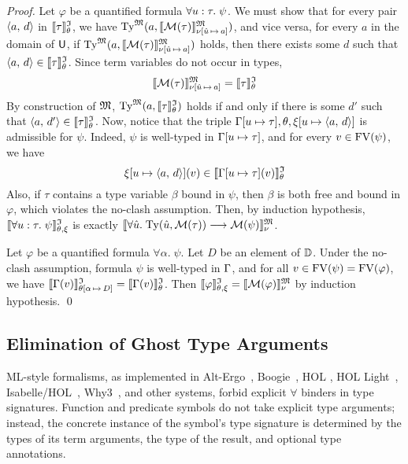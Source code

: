 \begin{proof}
Let $\varphi$ be a quantified formula $\forall u \mathrel{:} \tau .\; \psi$.
We must show that for every pair $\langle a,\, d \rangle$ in $\llbracket\tau\rrbracket^{\mathfrak{I}}_{\theta}$, we have
$\mathrm{Ty}^{\mathfrak{M}}(a, \llbracket \mathcal{M}(\tau) \rrbracket^{\mathfrak{M}}_{\nu[\hat{u}\,\mapsto\,a]})$,
and vice versa, for every $a$ in the domain of $\mathsf{U}$, if
$\mathrm{Ty}^{\mathfrak{M}}(a, \llbracket \mathcal{M}(\tau) \rrbracket^{\mathfrak{M}}_{\nu[\hat{u}\,\mapsto\,a]})$
holds, then there exists some $d$ such that $\langle a,\, d \rangle \in
\llbracket\tau\rrbracket^{\mathfrak{I}}_{\theta}$.
%
Since term variables do not occur in types,
\[\llbracket \mathcal{M}(\tau) \rrbracket^{\mathfrak{M}}_{\nu[\hat{u}\,\mapsto\,a]} =
\llbracket \tau \rrbracket^{\mathfrak{I}}_\theta\]%
By construction of $\mathfrak{M}$,
$\mathrm{Ty}^{\mathfrak{M}}(a, \llbracket \tau \rrbracket^{\mathfrak{I}}_\theta)$
holds if and only if there is some $d'$ such that
$\langle a,\, d' \rangle \in \llbracket \tau \rrbracket^{\mathfrak{I}}_\theta$.
%
Now, notice that the triple $\mathrm{\Gamma}[u \mapsto \tau],
\theta,\xi[u \mapsto \langle a,\, d \rangle]$ is admissible for $\psi$.
Indeed, $\psi$ is well-typed in $\mathrm{\Gamma}[u \mapsto \tau]$,
and for every $v \in \mathrm{FV}(\psi)$, we have
\[\xi[u \mapsto \langle a,\, d \rangle](v) \in \llbracket\mathrm{\Gamma}[u \mapsto \tau](v)\rrbracket^{\mathfrak{I}}_{\theta}\]%
Also, if $\tau$ contains a type variable $\beta$ bound in $\psi$,
then $\beta$ is both free and bound in $\varphi$, which violates
the no-clash assumption.
%
Then, by induction hypothesis, $\llbracket\forall u \mathrel{:} \tau .\; \psi\rrbracket^{\mathfrak{I}}_{\theta,\xi}$
is exactly $\llbracket \forall \hat{u} .\; \mathrm{Ty}(\hat{u},\mathcal{M}(\tau))
\longrightarrow \mathcal{M}(\psi) \rrbracket^{\mathfrak{M}}_{\nu}$.

Let $\varphi$ be a quantified formula $\forall \alpha .\; \psi$.
Let $D$ be an element of $\mathbb{D}$. Under the no-clash assumption,
formula $\psi$ is well-typed in $\mathrm{\Gamma}$, and for all
$v \in \mathrm{FV}(\psi) = \mathrm{FV}(\varphi)$, we have
$\llbracket\mathrm{\Gamma}(v)\rrbracket^{\mathfrak{I}}_{\theta[\alpha\,\mapsto\,D]} = \llbracket\mathrm{\Gamma}(v)\rrbracket^{\mathfrak{I}}_{\theta}$.
Then $\llbracket\varphi\rrbracket^{\mathfrak{I}}_{\theta,\xi} = \llbracket \mathcal{M}(\varphi) \rrbracket^{\mathfrak{M}}_{\nu}$ by induction hypothesis.
\qed
\end{proof}

\subsection{Elimination of Ghost Type Arguments} \label{ssec:ghost}


ML-style formalisms, as implemented in Alt-Ergo~\cite{conchon08smt},
Boogie~\cite{Barnett06boogie}, HOL \cite{gordon-melham-1993}, HOL
Light~\cite{harrison-1996}, Isabelle\slash HOL~\cite{nipkow-et-al-2002},
Why3~\cite{boogie11why3}, and other systems, forbid explicit $\forall$ binders
in type signatures. Function and predicate symbols do not take explicit type
arguments; instead, the concrete instance of the symbol's type signature is
determined by the types of its term arguments, the type of the result, and
optional type annotations.

